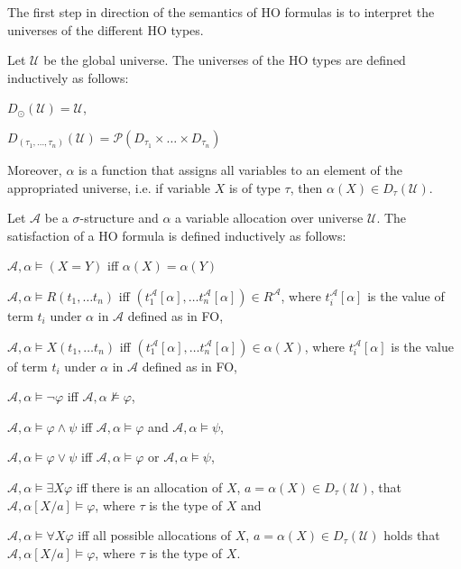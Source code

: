 The first step in direction of the semantics of HO formulas is to interpret the universes of the different HO types.

\begin{definition}
    Let $\mathcal{U}$ be the global universe. The universes of the HO types are defined inductively as follows:
    \begin{compactitem}
        \item $D_\odot(\mathcal{U}) = \mathcal{U}$,
        \item $D_{(\tau_1, \dots, \tau_n)}(\mathcal{U}) = \mathcal{P}(D_{\tau_1} \times \dots \times D_{\tau_n})$
    \end{compactitem}
\end{definition}

Moreover, $\alpha$ is a function that assigns all variables to an element of the appropriated universe, i.e. if
variable $X$ is of type $\tau$, then $\alpha(X) \in D_{\tau}(\mathcal{U})$.

\begin{definition}
    Let $\mathcal{A}$ be a $\sigma$-structure and $\alpha$ a variable allocation over universe $\mathcal{U}$. The
    satisfaction of a HO formula is defined inductively as follows:
    \begin{compactitem}
        \item $\mathcal{A}, \alpha \models (X = Y)$ iff $\alpha(X) = \alpha(Y)$
        \item $\mathcal{A}, \alpha \models R(t_1, \dots t_n)$ iff $(t_1^{\mathcal{A}}[\alpha], \dots
        t_n^{\mathcal{A}}[\alpha]) \in R^{\mathcal{A}}$, where $t_i^{\mathcal{A}}[\alpha]$ is the value of term
        $t_i$ under $\alpha$ in $\mathcal{A}$ defined as in FO,
        \item $\mathcal{A}, \alpha \models X(t_1, \dots t_n)$ iff $(t_1^{\mathcal{A}}[\alpha], \dots
        t_n^{\mathcal{A}}[\alpha]) \in \alpha(X)$, where $t_i^{\mathcal{A}}[\alpha]$ is the value of term
        $t_i$ under $\alpha$ in $\mathcal{A}$ defined as in FO,
        \item $\mathcal{A}, \alpha \models \neg\varphi$ iff $\mathcal{A}, \alpha\not\models\varphi$,
        \item $\mathcal{A}, \alpha \models \varphi \wedge \psi$ iff $\mathcal{A}, \alpha\models\varphi$ and $\mathcal{A},
        \alpha\models\psi$,
        \item $\mathcal{A}, \alpha \models \varphi \vee \psi$ iff $\mathcal{A}, \alpha\models\varphi$ or $\mathcal{A},
        \alpha\models\psi$,
        \item $\mathcal{A}, \alpha \models \exists X\varphi$ iff there is an allocation of $X$, $a = \alpha(X) \in D_{\tau}
        (\mathcal{U})$, that $\mathcal{A}, \alpha[X/a] \models \varphi$, where $\tau$ is the type of $X$ and
        \item $\mathcal{A}, \alpha \models \forall X\varphi$ iff all possible allocations of $X$, $a = \alpha(X) \in
        D_{\tau}(\mathcal{U})$ holds that $\mathcal{A}, \alpha[X/a] \models \varphi$, where $\tau$ is the type of $X$.
        \end{compactitem}
\end{definition}

